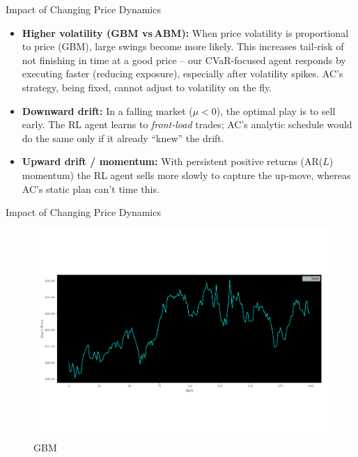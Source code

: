\documentclass[11pt,aspectratio=169]{beamer}   %
\begin{document}
\begin{frame}{Impact of Changing Price Dynamics}
	\begin{itemize}
		\item \textbf{Higher volatility (GBM vs ABM):} When price volatility is proportional to price (GBM), large swings become more likely. This increases tail‑risk of not finishing in time at a good price – our CVaR‑focused agent responds by executing faster (reducing exposure), especially after volatility spikes. AC’s strategy, being fixed, cannot adjust to volatility on the fly.
		\item \textbf{Downward drift:} In a falling market ($\mu<0$), the optimal play is to sell early. The RL agent learns to \emph{front‑load} trades; AC’s analytic schedule would do the same only if it already “knew” the drift.
		\item \textbf{Upward drift / momentum:} With persistent positive returns (AR($L$) momentum) the RL agent sells more slowly to capture the up‑move, whereas AC’s static plan can’t time this.
	\end{itemize}
\end{frame}

\begin{frame}{Impact of Changing Price Dynamics}
	\begin{figure}[ht]
		\centering
		\includegraphics[width=0.8\linewidth]{gbm.pdf}
		\caption{GBM}
	\end{figure}
\end{frame}
\end{document}
